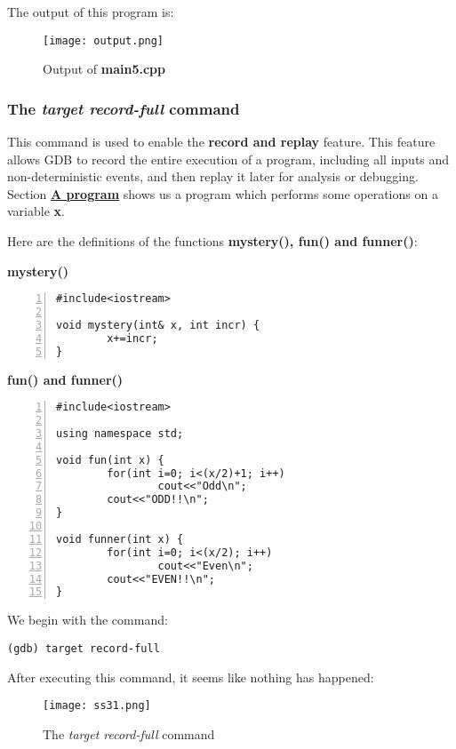 \documentclass{article}
\makeatletter
\renewcommand\paragraph{\@startsection{paragraph}{4}{\z@}{-3.25ex \@plus -1ex \@minus -.2ex}{1.5ex \@plus .2ex}{\normalfont\normalsize\bfseries}}
\makeatother
\begin{document}
The output of this program is:
\begin{figure}[h]
\centering
\texttt{[image: output.png]}
\caption{Output of \textbf{main5.cpp}}
\end{figure}

\newpage
\subsubsection{The \textit{target record-full} command}
\paragraph{}
This command is used to enable the \textbf{record and replay} feature. This feature allows GDB to record the entire execution of a program, including all inputs and non-deterministic events, and then replay it later for analysis or debugging.
Section \hyperref[sec:program]{\textbf{A program}} shows us a program which performs some operations on a variable \textbf{x}.

Here are the definitions of the functions \textbf{mystery(), fun() and funner()}:


\vspace{20pt}
\textbf{mystery()}
\begin{Verbatim}[numbers=left, frame=single]
#include<iostream>

void mystery(int& x, int incr) {
        x+=incr;
}
\end{Verbatim}

\vspace{20pt}
\textbf{fun() and funner()}
\begin{Verbatim}[numbers=left, frame=single]
#include<iostream>

using namespace std;

void fun(int x) {
        for(int i=0; i<(x/2)+1; i++)
                cout<<"Odd\n";
        cout<<"ODD!!\n";
}

void funner(int x) {
        for(int i=0; i<(x/2); i++)
                cout<<"Even\n";
        cout<<"EVEN!!\n";
}
\end{Verbatim}

We begin with the command:

\begin{Verbatim}[frame=single]
(gdb) target record-full
\end{Verbatim}
\newpage
After executing this command, it seems like nothing has happened:
\begin{figure}[h]
\centering
\texttt{[image: ss31.png]}
\caption{The \textit{target record-full} command}
\end{figure}
\end{document}
